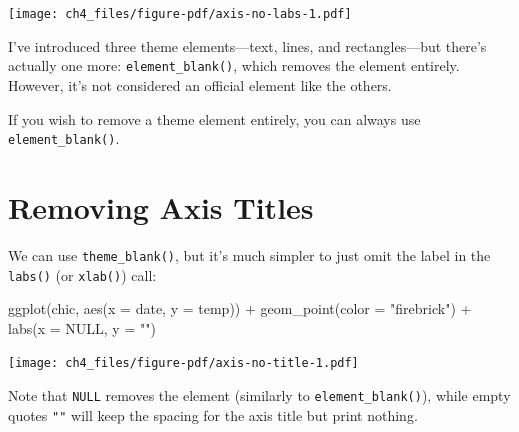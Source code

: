 \documentclass[
  letterpaper,
]{scrbook}
\newenvironment{Shaded}{\begin{snugshade}}{\end{snugshade}}
\newcommand{\AttributeTok}[1]{\textcolor[rgb]{0.40,0.45,0.13}{#1}}
\newcommand{\ConstantTok}[1]{\textcolor[rgb]{0.56,0.35,0.01}{#1}}
\newcommand{\FunctionTok}[1]{\textcolor[rgb]{0.28,0.35,0.67}{#1}}
\newcommand{\NormalTok}[1]{\textcolor[rgb]{0.00,0.23,0.31}{#1}}
\newcommand{\SpecialCharTok}[1]{\textcolor[rgb]{0.37,0.37,0.37}{#1}}
\newcommand{\StringTok}[1]{\textcolor[rgb]{0.13,0.47,0.30}{#1}}
\begin{document}
\texttt{[image: ch4\_files/figure-pdf/axis-no-labs-1.pdf]}

I've introduced three theme elements---text, lines, and rectangles---but
there's actually one more: \texttt{element\_blank()}, which removes the
element entirely. However, it's not considered an official element like
the others.

\begin{tcolorbox}[enhanced jigsaw, toprule=.15mm, bottomtitle=1mm, coltitle=black, breakable, colbacktitle=quarto-callout-tip-color!10!white, opacityback=0, toptitle=1mm, colframe=quarto-callout-tip-color-frame, titlerule=0mm, title=\textcolor{quarto-callout-tip-color}{\faLightbulb}\hspace{0.5em}{Removing Theme Element}, bottomrule=.15mm, arc=.35mm, opacitybacktitle=0.6, leftrule=.75mm, left=2mm, rightrule=.15mm, colback=white]

If you wish to remove a theme element entirely, you can always use
\texttt{element\_blank()}.

\end{tcolorbox}

\section{Removing Axis Titles}\label{removing-axis-titles}

We can use \texttt{theme\_blank()}, but it's much simpler to just omit
the label in the \texttt{labs()} (or \texttt{xlab()}) call:

\begin{Shaded}
\begin{Highlighting}[]
\FunctionTok{ggplot}\NormalTok{(chic, }\FunctionTok{aes}\NormalTok{(}\AttributeTok{x =}\NormalTok{ date, }\AttributeTok{y =}\NormalTok{ temp)) }\SpecialCharTok{+}
  \FunctionTok{geom\_point}\NormalTok{(}\AttributeTok{color =} \StringTok{"firebrick"}\NormalTok{) }\SpecialCharTok{+}
  \FunctionTok{labs}\NormalTok{(}\AttributeTok{x =} \ConstantTok{NULL}\NormalTok{, }\AttributeTok{y =} \StringTok{""}\NormalTok{)}
\end{Highlighting}
\end{Shaded}

\texttt{[image: ch4\_files/figure-pdf/axis-no-title-1.pdf]}

\begin{tcolorbox}[enhanced jigsaw, toprule=.15mm, bottomtitle=1mm, coltitle=black, breakable, colbacktitle=quarto-callout-tip-color!10!white, opacityback=0, toptitle=1mm, colframe=quarto-callout-tip-color-frame, titlerule=0mm, title=\textcolor{quarto-callout-tip-color}{\faLightbulb}\hspace{0.5em}{RAnother Tip!}, bottomrule=.15mm, arc=.35mm, opacitybacktitle=0.6, leftrule=.75mm, left=2mm, rightrule=.15mm, colback=white]

Note that \texttt{NULL} removes the element (similarly to
\texttt{element\_blank()}), while empty quotes \texttt{""} will keep the
spacing for the axis title but print nothing.

\end{tcolorbox}
\end{document}
